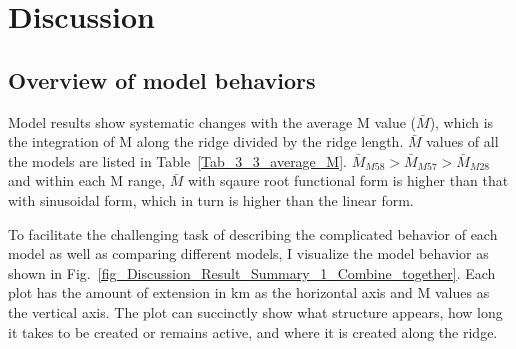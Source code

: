 \pagebreak
\section{Discussion}

\subsection{Overview of model behaviors}

Model results show systematic changes with the average M value ($\bar{M}$), which is the integration of M along the ridge divided by the ridge length. $\bar{M}$ values of all the models are listed in Table~\hyperref[Tab_3_3_average_M]{\ref{Tab_3_3_average_M}}. $\bar{M}_{M58} > \bar{M}_{M57} > \bar{M}_{M28}$ and within each M range, $\bar{M}$ with sqaure root functional form is higher than that with sinusoidal form, which in turn is higher than the linear form.


To facilitate the challenging task of describing the complicated behavior of each model as well as comparing different models, I visualize the model behavior as shown in Fig.~\hyperref[fig_Discussion_Result_Summary_1_Combine_together]{\ref{fig_Discussion_Result_Summary_1_Combine_together}}. Each plot has the amount of extension in km as the horizontal axis and M values as the vertical axis. The plot can succinctly show what structure appears, how long it takes to be created or remains active, and where it is created along the ridge. 

